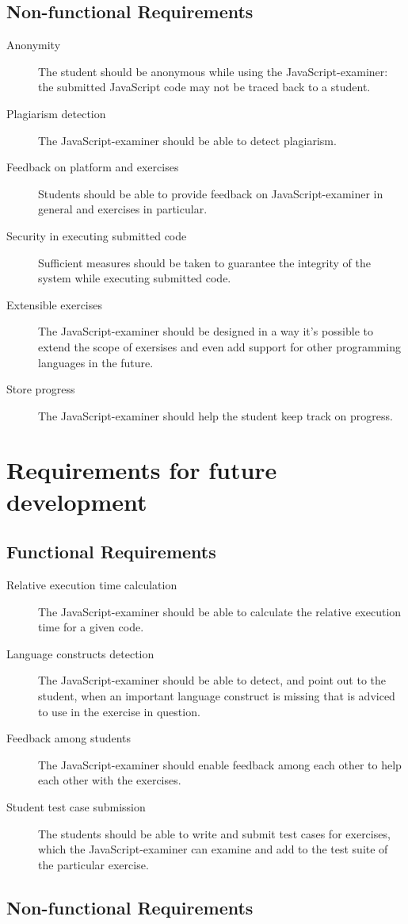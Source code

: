 \documentclass{article}
\begin{document}
\subsection{Non-functional Requirements}
\begin{description}
  \item[Anonymity] The student should be anonymous while using the 
  JavaScript-examiner: the submitted JavaScript code may not be traced back to 
  a student.
  \item[Plagiarism detection] The JavaScript-examiner should be able to detect
  plagiarism.
  \item[Feedback on platform and exercises] Students should be able to provide
  feedback on JavaScript-examiner in general and exercises in particular.
  \item[Security in executing submitted code] Sufficient measures should be 
  taken to guarantee the integrity of the system while executing submitted code.
  \item[Extensible exercises] The JavaScript-examiner should be designed in a
  way it's possible to extend the scope of exersises and even add support
  for other programming languages in the future. 
  \item[Store progress] The JavaScript-examiner should help the 
  student keep track on progress.
\end{description}


\section{Requirements for future development}
\subsection{Functional Requirements}
\begin{description}
  \item[Relative execution time calculation] The JavaScript-examiner should be 
    able to calculate the relative execution time for a given code.
  \item[Language constructs detection] The JavaScript-examiner should be able 
    to detect, and point out to the student, when an important language 
	construct is missing that is adviced to use in the exercise in question.
  \item[Feedback among students] The JavaScript-examiner should enable feedback
	among each other to help each other with the exercises. 
  \item[Student test case submission] The students should be able to write and
  submit test cases for exercises, which the JavaScript-examiner can examine and
  add to the test suite of the particular exercise.
\end{description}
\subsection{Non-functional Requirements}
\end{document}
